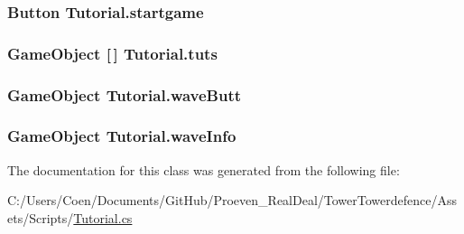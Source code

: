 \subsubsection[{\texorpdfstring{startgame}{startgame}}]{\setlength{\rightskip}{0pt plus 5cm}Button Tutorial.\+startgame}\hypertarget{class_tutorial_a62c809e56c6642f685fc5208fa97b5b4}{}\label{class_tutorial_a62c809e56c6642f685fc5208fa97b5b4}
\subsubsection[{\texorpdfstring{tuts}{tuts}}]{\setlength{\rightskip}{0pt plus 5cm}Game\+Object \mbox{[}$\,$\mbox{]} Tutorial.\+tuts}\hypertarget{class_tutorial_a7cd8df9581f7c3a46691e7d122055a06}{}\label{class_tutorial_a7cd8df9581f7c3a46691e7d122055a06}
\subsubsection[{\texorpdfstring{wave\+Butt}{waveButt}}]{\setlength{\rightskip}{0pt plus 5cm}Game\+Object Tutorial.\+wave\+Butt}\hypertarget{class_tutorial_a82cf9d740bdfe90be101103d17ef5350}{}\label{class_tutorial_a82cf9d740bdfe90be101103d17ef5350}
\subsubsection[{\texorpdfstring{wave\+Info}{waveInfo}}]{\setlength{\rightskip}{0pt plus 5cm}Game\+Object Tutorial.\+wave\+Info}\hypertarget{class_tutorial_a0e11b3f09e3901893a00efb8a400cff8}{}\label{class_tutorial_a0e11b3f09e3901893a00efb8a400cff8}


The documentation for this class was generated from the following file\+:\begin{DoxyCompactItemize}
\item 
C\+:/\+Users/\+Coen/\+Documents/\+Git\+Hub/\+Proeven\+\_\+\+Real\+Deal/\+Tower\+Towerdefence/\+Assets/\+Scripts/\hyperlink{_tutorial_8cs}{Tutorial.\+cs}\end{DoxyCompactItemize}
